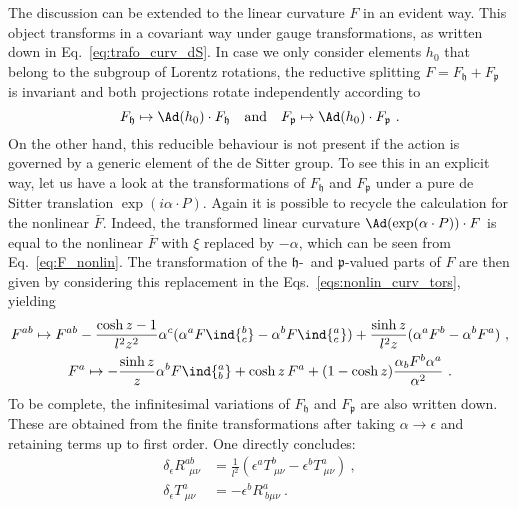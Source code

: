 \documentclass[11pt]{article}
\begin{document}
The discussion can be extended to the linear curvature $F$ in an 
evident way. This object transforms in a covariant way under 
gauge transformations, as written down in 
Eq.~\eqref{eq:trafo_curv_dS}. In case we only consider elements 
$h_0$ that belong to the subgroup of Lorentz rotations, the 
reductive splitting $F = F_\mathfrak{h} + F_\mathfrak{p}$ is 
invariant and both projections rotate independently according to
\begin{displaymath}
	F_\mathfrak{h} \mapsto \Ad(h_0)\cdot F_\mathfrak{h}
	\quad \text{and} \quad
	 F_\mathfrak{p}\mapsto \Ad(h_0)\cdot F_\mathfrak{p}~.
\end{displaymath}
On the other hand, this reducible behaviour is not present if the 
action is governed by a generic element of the de Sitter group.  
To see this in an explicit way, let us have a look at the 
transformations of $F_\mathfrak{h}$ and $F_\mathfrak{p}$ under a 
pure de Sitter translation $\exp(i\alpha\cdot P)$. Again it is 
possible to recycle the calculation for the nonlinear $\bar{F}$.  
Indeed, the transformed linear curvature $\Ad(\exp(\alpha\cdot 
P))\cdot F$ is equal to the nonlinear $\bar{F}$ with $\xi$ 
replaced by $-\alpha$, which can be seen from 
Eq.~\eqref{eq:F_nonlin}. The transformation of the 
$\mathfrak{h}$-~and $\mathfrak{p}$-valued parts of $F$ are then 
given by considering this replacement in the 
Eqs.~\eqref{eqs:nonlin_curv_tors}, yielding
\begin{subequations}
\label{eqs:transvec_Fh_Fp}
\begin{gather}
\label{eq:transvec_Fh}
	F^{ab} \mapsto F^{ab} - \frac{\cosh z - 1}{l^2 z^2} \alpha^c 
	(\alpha^a F\ind{^b_c} -  \alpha^b F\ind{^a_c}) + \frac{\sinh z}{l^2 
		z} (\alpha^a F^b - \alpha^b F^a)~,
\\
\label{eq:transvec_Fp}
	F^a \mapsto -\frac{\sinh z}{z} \alpha^b F\ind{^a_b} + \cosh 
	z\, F^a + (1 - \cosh z) \frac{\alpha_b F^b 
		\alpha^a}{\alpha^2}~.
\end{gather}
\end{subequations}
To be complete, the infinitesimal variations of $F_\mathfrak{h}$ 
and $F_\mathfrak{p}$ are also written down. These are obtained 
from the finite transformations after taking $\alpha \to 
\epsilon$ and retaining terms up to first order. One directly 
concludes:
\begin{subequations}
\begin{align}
	\delta_\epsilon R^{ab}_{~~\mu\nu} &= \frac{1}{l^2}(\epsilon^a 
	T^b_{~\mu\nu} - \epsilon^b T^a_{~\mu\nu})~, \\
	\delta_\epsilon T^a_{~\mu\nu} &= -\epsilon^b R^a_{~b\mu\nu}~.
\end{align}
\end{subequations}
\end{document}
